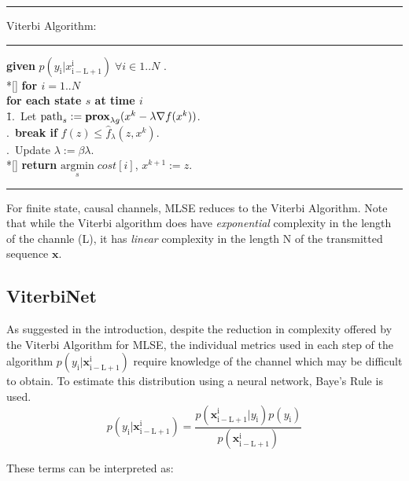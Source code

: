 \documentclass[12pt,a4paper]{report}
\begin{document}
    \noindent\rule[16pt]{\textwidth}{0.6pt}
	Viterbi Algorithm:

    \noindent\rule[10pt]{\textwidth}{0.4pt}
    {\footnotesize
    \begin{tabbing}
        {\bf given} $p(y_{\mathrm{i}}|x_{\mathrm{i-L+1}}^{\mathrm{i}}) \; \forall i \in {1..N}$ . \\*[\smallskipamount]
        {\bf for $i = 1..N $} \\
         \qquad \= {\bf for each state $s$ at time $i$}\\
        \qquad \qquad \= 1.\ Let $\mathrm{path}_{s} := \mathbf{prox}_{\lambda g}(x^{k} - \lambda \nabla f(x^{k}))$. \\
        .\ {\bf break if} $f(z) \leq \hat{f}_{\lambda}(z, x^{k})$. \\
        .\ Update $\lambda := \beta \lambda$. \\*[\smallskipamount]
        {\bf return} $\underset{s}{\text{argmin}} \; cost[i] $, $x^{k+1}:=z$.
    \end{tabbing}}
    \noindent\rule[10pt]{\textwidth}{0.4pt}


For finite state, causal channels, MLSE reduces to the Viterbi Algorithm. Note that while the Viterbi algorithm does have \emph{exponential} complexity in the length of the channle (L), it has \emph{linear} complexity in the length N of the transmitted sequence $\mathbf{x}$. 


\subsection{ViterbiNet}
As suggested in the introduction, despite the reduction in complexity offered by the Viterbi Algorithm for MLSE, the individual metrics used in each step of the algorithm 
$p(y_{\mathrm{i}}|\mathbf{x}_{\mathrm{i-L+1}}^{\mathrm{i}}) $ require knowledge of the channel which may be difficult to obtain. To estimate this distribution using a neural network, Baye's Rule is used. 
\begin{equation}
p(y_{\mathrm{i}}|\mathbf{x}_{\mathrm{i-L+1}}^{\mathrm{i}}) = 
\frac
{p(\mathbf{x}_{\mathrm{i-L+1}}^{\mathrm{i}}|y_{\mathrm{i}})p(y_{\mathrm{i}})}
{p(\mathbf{x}_{\mathrm{i-L+1}}^{\mathrm{i}})}
\end{equation}

These terms can be interpreted as:
\end{document}
